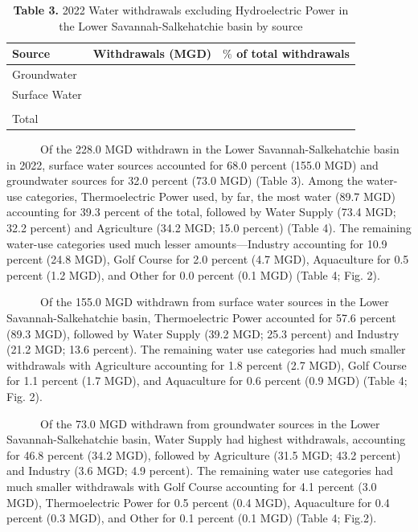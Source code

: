 \documentclass[
]{article}
\begin{document}
\begin{table}[!h]
\centering
\caption{\label{tab:summary-source-no-PH}\textbf{Table 3.} 2022 Water withdrawals excluding Hydroelectric Power in the Lower Savannah-Salkehatchie basin by source }
\centering
\begin{tabular}[t]{l>{\raggedleft\arraybackslash}m{3 cm}>{\raggedleft\arraybackslash}m{3 cm}}
\toprule
Source & Withdrawals (MGD) & $\%$ of total withdrawals\\
\midrule
Groundwater & 73 & 32\\
Surface Water & 155 & 68\\
\midrule\\
Total & 228 & 100\\
\bottomrule
\end{tabular}
\end{table}

~~~~~~Of the 228.0 MGD withdrawn in the Lower Savannah-Salkehatchie
basin in 2022, surface water sources accounted for 68.0 percent (155.0
MGD) and groundwater sources for 32.0 percent (73.0 MGD) (Table 3).
Among the water-use categories, Thermoelectric Power used, by far, the
most water (89.7 MGD) accounting for 39.3 percent of the total, followed
by Water Supply (73.4 MGD; 32.2 percent) and Agriculture (34.2 MGD; 15.0
percent) (Table 4). The remaining water-use categories used much lesser
amounts---Industry accounting for 10.9 percent (24.8 MGD), Golf Course
for 2.0 percent (4.7 MGD), Aquaculture for 0.5 percent (1.2 MGD), and
Other for 0.0 percent (0.1 MGD) (Table 4; Fig. 2).

~~~~~~Of the 155.0 MGD withdrawn from surface water sources in the Lower
Savannah-Salkehatchie basin, Thermoelectric Power accounted for 57.6
percent (89.3 MGD), followed by Water Supply (39.2 MGD; 25.3 percent)
and Industry (21.2 MGD; 13.6 percent). The remaining water use
categories had much smaller withdrawals with Agriculture accounting for
1.8 percent (2.7 MGD), Golf Course for 1.1 percent (1.7 MGD), and
Aquaculture for 0.6 percent (0.9 MGD) (Table 4; Fig. 2).

~~~~~~Of the 73.0 MGD withdrawn from groundwater sources in the Lower
Savannah-Salkehatchie basin, Water Supply had highest withdrawals,
accounting for 46.8 percent (34.2 MGD), followed by Agriculture (31.5
MGD; 43.2 percent) and Industry (3.6 MGD; 4.9 percent). The remaining
water use categories had much smaller withdrawals with Golf Course
accounting for 4.1 percent (3.0 MGD), Thermoelectric Power for 0.5
percent (0.4 MGD), Aquaculture for 0.4 percent (0.3 MGD), and Other for
0.1 percent (0.1 MGD) (Table 4; Fig.2).
\end{document}
